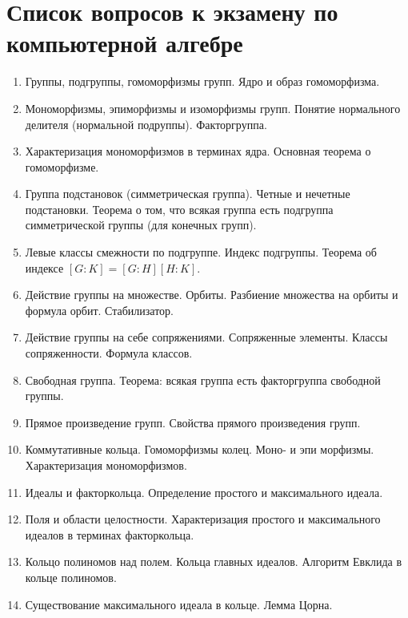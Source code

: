 \documentclass[a4paper,10pt]{article}
\begin{document}
\section*{Список вопросов к экзамену по компьютерной алгебре}

\begin{enumerate}

  \item Группы, подгруппы, гомоморфизмы групп.
        Ядро и образ гомоморфизма.
  \item Мономорфизмы, эпиморфизмы и изоморфизмы групп.
        Понятие нормального делителя (нормальной подруппы).
        Факторгруппа.
  \item Характеризация мономорфизмов в терминах ядра.
        Основная теорема о гомоморфизме.
  \item Группа подстановок (симметрическая группа).
        Четные и нечетные подстановки.
        Теорема о том, что всякая группа есть подгруппа симметрической группы (для конечных групп).
  \item Левые классы смежности по подгруппе.
        Индекс подгруппы.
        Теорема об индексе ${[G:K]} = {[G:H][H:K]}$.
  \item Действие группы на множестве.
        Орбиты.
        Разбиение множества на орбиты и формула орбит.
        Стабилизатор.
  \item Действие группы на себе сопряжениями.
        Сопряженные элементы.
        Классы сопряженности.
        Формула классов.
  \item Свободная группа.
        Теорема: всякая группа есть факторгруппа свободной группы.
  \item Прямое произведение групп.
        Свойства прямого произведения групп.
  \item Коммутативные кольца.
        Гомоморфизмы колец.
        Моно- и эпи морфизмы. %
        Характеризация мономорфизмов.
  \item Идеалы и факторкольца.
        Определение простого и максимального идеала.
  \item Поля и области целостности.
        Характеризация простого и максимального идеалов в терминах факторкольца.
  \item Кольцо полиномов над полем.
        Кольца главных идеалов.
        Алгоритм Евклида в кольце полиномов.
  \item Существование максимального идеала в кольце.
        Лемма Цорна.

\end{enumerate}
\end{document}
